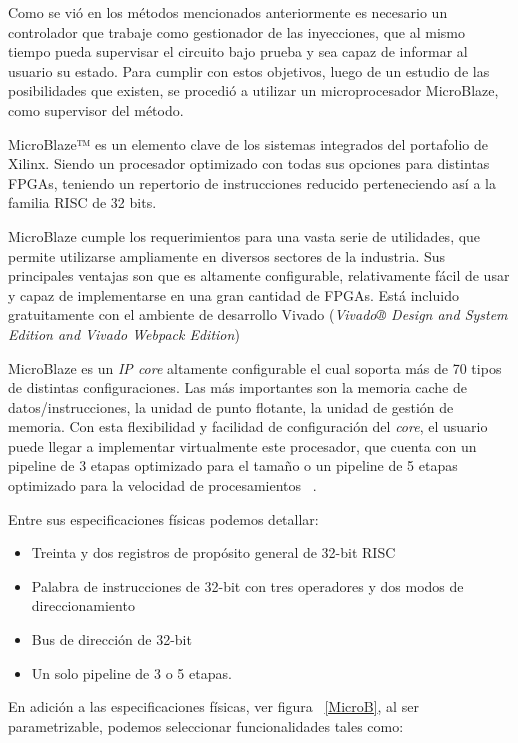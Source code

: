 \documentclass[a4paper,openright,12pt]{report}
\begin{document}
Como se vió en los métodos mencionados anteriormente es necesario un controlador que trabaje como gestionador de las inyecciones, que al mismo tiempo pueda supervisar el circuito bajo prueba y sea capaz de informar al usuario su estado.
Para cumplir con estos objetivos, luego de un estudio de las posibilidades que existen, se procedió a utilizar un microprocesador MicroBlaze, como supervisor del método.

MicroBlaze™ es un elemento clave de los sistemas integrados del portafolio de Xilinx. Siendo un procesador optimizado con todas sus opciones para distintas FPGAs,  teniendo un repertorio de instrucciones reducido perteneciendo así a la familia RISC de 32 bits. 

MicroBlaze cumple los requerimientos para una vasta serie de utilidades, que permite utilizarse ampliamente en diversos sectores de la industria. Sus principales ventajas son que es altamente configurable, relativamente fácil de usar y capaz de implementarse en una gran cantidad de FPGAs. Está incluido gratuitamente con el ambiente de desarrollo Vivado (\textit{Vivado® Design and System Edition and Vivado Webpack Edition})

MicroBlaze es un \textit{IP core} altamente configurable  el cual soporta más de 70 tipos de distintas configuraciones. Las más importantes son la memoria cache de datos/instrucciones, la unidad de punto flotante, la unidad de gestión de memoria. Con esta flexibilidad y facilidad de configuración del \textit{core}, el usuario puede llegar a implementar virtualmente este procesador, que cuenta con un pipeline de 3 etapas optimizado para el tamaño o un pipeline de 5 etapas optimizado para la velocidad de procesamientos ~\cite{MICRO}.

Entre sus especificaciones físicas podemos detallar:

\begin{itemize}
\item Treinta y dos registros de propósito general de 32-bit RISC
\item  Palabra de instrucciones de 32-bit con tres operadores y dos modos de direccionamiento
\item  Bus de dirección de 32-bit
\item Un solo pipeline de 3 o 5 etapas.
\end{itemize}

En adición a las especificaciones físicas, ver figura ~\ref{MicroB}, al ser parametrizable, podemos seleccionar funcionalidades tales como:
\end{document}
